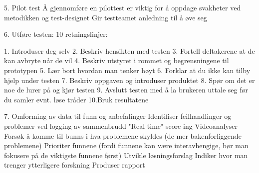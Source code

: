 5. Pilot test 
	Å gjennomføre en pilottest er viktig for å oppdage svakheter ved metodikken og test-designet 
	Gir testteamet anledning til å øve seg 

6. Utføre testen: 
	10 retningslinjer:

	1. Introduser deg selv 
	2. Beskriv hensikten med testen 
	3. Fortell deltakerene at de kan avbryte når de vil 
	4. Beskriv utstyret i rommet og begrensningene til prototypen 
	5. Lær bort hvordan man tenker høyt 
	6. Forklar at du ikke kan tilby hjelp under testen 
	7. Beskriv oppgaven og introduser produktet 
	8. Spør om det er noe de lurer på og kjør testen 
	9. Avslutt testen med å la brukeren uttale seg før du samler evnt. løse tråder 
	10.Bruk resultatene

7. Omforming av data til funn og anbefalinger 
	Identifiser feilhandlinger og problemer ved logging av sammenbrudd 
	"Real time" score-ing 
	Videoanalyser 
	Forsøk å komme til bunns i hva problemene skyldes (de mer bakenforliggende problemene) 
	Prioriter funnene (fordi funnene kan være interavhengige, bør man fokusere på de viktigste funnene først) 
	Utvikle løsningsforslag 
	Indiker hvor man trenger ytterligere forskning 
	Produser rapport 



